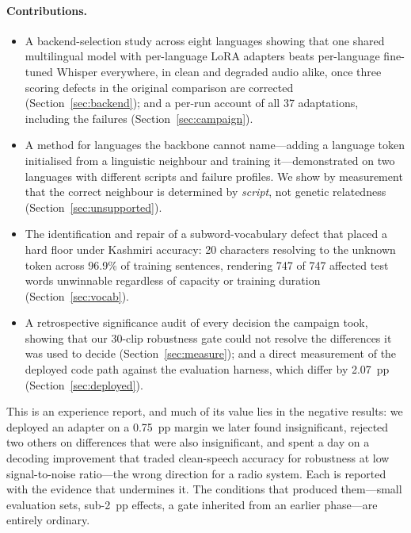 \documentclass[sigconf,anonymous,review]{acmart}
\begin{document}
\paragraph{Contributions.}
\begin{itemize}
\item A backend-selection study across eight languages showing that one shared
multilingual model with per-language LoRA adapters beats per-language fine-tuned
Whisper everywhere, in clean and degraded audio alike, once three scoring
defects in the original comparison are corrected (Section~\ref{sec:backend});
and a per-run account of all 37 adaptations, including the failures
(Section~\ref{sec:campaign}).

\item A method for languages the backbone cannot name---adding a language token
initialised from a linguistic neighbour and training it---demonstrated on two
languages with different scripts and failure profiles. We show by measurement
that the correct neighbour is determined by \emph{script}, not genetic
relatedness (Section~\ref{sec:unsupported}).

\item The identification and repair of a subword-vocabulary defect that placed a
hard floor under Kashmiri accuracy: 20 characters resolving to the unknown token
across 96.9\% of training sentences, rendering 747 of 747 affected test words
unwinnable regardless of capacity or training duration
(Section~\ref{sec:vocab}).

\item A retrospective significance audit of every decision the campaign took,
showing that our 30-clip robustness gate could not resolve the differences it
was used to decide (Section~\ref{sec:measure}); and a direct measurement of the
deployed code path against the evaluation harness, which differ by 2.07~pp
(Section~\ref{sec:deployed}).
\end{itemize}

This is an experience report, and much of its value lies in the negative
results: we deployed an adapter on a 0.75~pp margin we later found
insignificant, rejected two others on differences that were also insignificant,
and spent a day on a decoding improvement that traded clean-speech accuracy for
robustness at low signal-to-noise ratio---the wrong direction for a radio
system. Each is reported with the evidence that undermines it. The conditions
that produced them---small evaluation sets, sub-2~pp effects, a gate inherited
from an earlier phase---are entirely ordinary.
\end{document}
